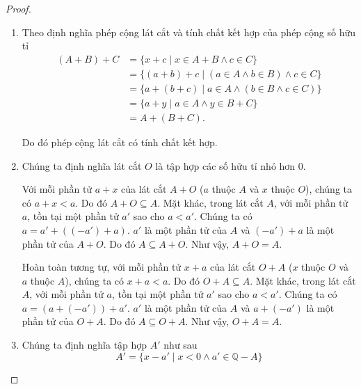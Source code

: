 \begin{proof}
    \begin{enumerate}[label={(\roman*)}]
        \item Theo định nghĩa phép cộng lát cắt và tính chất kết hợp của phép cộng số hữu tỉ
              \begin{align*}
                  (A + B) + C & = \{ x + c \mid x\in A + B \wedge c\in C \}                  \\
                              & = \{ (a + b) + c \mid (a\in A\wedge b\in B)\wedge c\in C \}  \\
                              & = \{ a + (b + c) \mid a\in A \wedge (b\in B\wedge c\in C) \} \\
                              & = \{ a + y \mid a\in A \wedge y\in B + C \}                  \\
                              & = A + (B + C).
              \end{align*}

              Do đó phép cộng lát cắt có tính chất kết hợp.
        \item Chúng ta định nghĩa lát cắt $O$ là tập hợp các số hữu tỉ nhỏ hơn $0$.

              Với mỗi phần tử $a + x$ của lát cắt $A + O$ ($a$ thuộc $A$ và $x$ thuộc $O$), chúng ta có $a + x < a$. Do đó $A + O \subseteq A$. Mặt khác, trong lát cắt $A$, với mỗi phần tử $a$, tồn tại một phần tử $a'$ sao cho $a < a'$. Chúng ta có $a = a' + ((-a') + a)$. $a'$ là một phần tử của $A$ và $(-a') + a$ là một phần tử của $A + O$. Do đó $A \subseteq A + O$. Như vậy, $A + O = A$.

              Hoàn toàn tương tự, với mỗi phần tử $x + a$ của lát cắt $O + A$ ($x$ thuộc $O$ và $a$ thuộc $A$), chúng ta có $x + a < a$. Do đó $O + A \subseteq A$. Mặt khác, trong lát cắt $A$, với mỗi phần tử $a$, tồn tại một phần tử $a'$ sao cho $a < a'$. Chúng ta có $a = (a + (-a')) + a'$. $a'$ là một phần tử của $A$ và $a + (-a')$ là một phần tử của $O + A$. Do đó $A \subseteq O + A$. Như vậy, $O + A = A$.
        \item Chúng ta định nghĩa tập hợp $A'$ như sau
              \[
                  A' = \{ x - a' \mid x < 0 \wedge a'\in \mathbb{Q} - A \}
              \]


\end{enumerate}
\end{proof}
